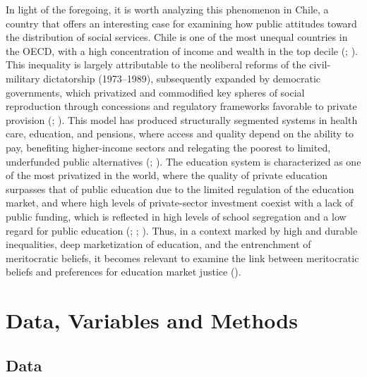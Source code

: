 \documentclass[
  spanish,
  a4paper,
  oneside]{scrbook}
\begin{document}
In light of the foregoing, it is worth analyzing this phenomenon in
Chile, a country that offers an interesting case for examining how
public attitudes toward the distribution of social services. Chile is
one of the most unequal countries in the OECD, with a high concentration
of income and wealth in the top decile
(;
). This inequality is
largely attributable to the neoliberal reforms of the civil-military
dictatorship (1973--1989), subsequently expanded by democratic
governments, which privatized and commodified key spheres of social
reproduction through concessions and regulatory frameworks favorable to
private provision (;
). This model has
produced structurally segmented systems in health care, education, and
pensions, where access and quality depend on the ability to pay,
benefiting higher-income sectors and relegating the poorest to limited,
underfunded public alternatives
(;
). The education system is characterized as one of the most
privatized in the world, where the quality of private education
surpasses that of public education due to the limited regulation of the
education market, and where high levels of private-sector investment
coexist with a lack of public funding, which is reflected in high levels
of school segregation and a low regard for public education
(;
;
).
Thus, in a context marked by high and durable inequalities, deep
marketization of education, and the entrenchment of meritocratic
beliefs, it becomes relevant to examine the link between meritocratic
beliefs and preferences for education market justice
().


\chapter{Data, Variables and Methods}\label{data-variables-and-methods}

\section{Data}\label{data}
\end{document}
